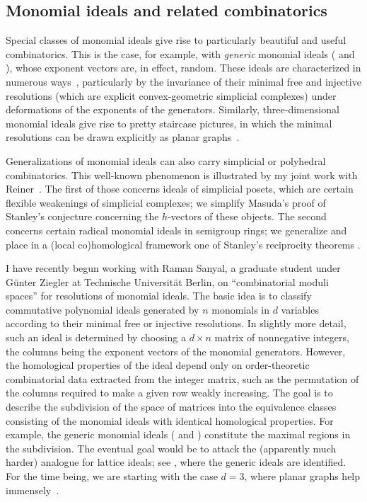\documentclass[11pt]{proposal}
\begin{document}
\subsection{Monomial ideals and related combinatorics}%


Special classes of monomial ideals give rise to particularly beautiful
and useful combinatorics.  This is the case, for example, with
\emph{generic} monomial ideals (\cite{BPS98} and \cite{generic}),
whose exponent vectors are, in effect, random.  These ideals are
characterized in numerous ways~\cite{generic}, particularly by the
invariance of their minimal free and injective resolutions (which are
explicit convex-geometric simplicial complexes) under deformations of
the exponents of the generators.  Similarly, three-dimensional
monomial ideals give rise to pretty staircase pictures, in which the
minimal resolutions can be drawn explicitly as planar
graphs~\cite{planarGraphs,AAECC}.

Generalizations of monomial ideals can also carry simplicial or
polyhedral combinatorics.  This well-known phenomenon is illustrated
by my joint work with Reiner~\cite{simplicialPoset,reciprocal}.  The
first of those concerns ideals of simplicial posets, which are certain
flexible weakenings of simplicial complexes; we simplify Masuda's
proof \cite{masuda03} of Stanley's conjecture \cite{Sta91} concerning
the $h$-vectors of these objects.  The second concerns certain radical
monomial ideals in semigroup rings; we generalize and place in a
(local co)homological framework one of Stanley's reciprocity theorems
\cite{Sta74}.


I have recently begun working with Raman Sanyal, a graduate student
under G\"unter Ziegler at Technische Universit\"at Berlin, on
``combinatorial moduli spaces'' for resolutions of monomial ideals.
The basic idea is to classify commutative polynomial ideals generated
by $n$ monomials in $d$ variables according to their minimal free or
injective resolutions.  In slightly more detail, such an ideal is
determined by choosing a $d \times n$ matrix of nonnegative integers,
the columns being the exponent vectors of the monomial generators.
However, the homological properties of the ideal depend only on
order-theoretic combinatorial data extracted from the integer matrix,
such as the permutation of the columns required to make a given row
weakly increasing.  The goal is to describe the subdivision of the
space of matrices into the equivalence classes consisting of the
monomial ideals with identical homological properties.  For example,
the generic monomial ideals (\cite{BPS98} and \cite{generic})
constitute the maximal regions in the subdivision.  The eventual goal
would be to attack the (apparently much harder) analogue for lattice
ideals; see \cite{PS98}, where the generic ideals are identified.  For
the time being, we are starting with the case $d = 3$, where planar
graphs help immensely~\cite{planarGraphs}.
\end{document}

